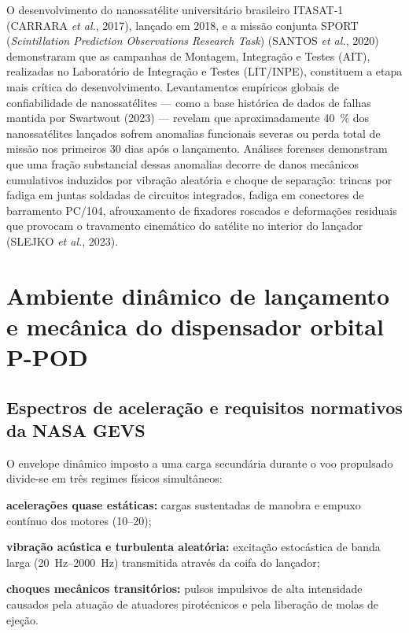 O desenvolvimento do nanossatélite universitário brasileiro ITASAT-1 (CARRARA \textit{et al.}, 2017), lançado em 2018, e a missão conjunta SPORT (\textit{Scintillation Prediction Observations Research Task}) (SANTOS \textit{et al.}, 2020) demonstraram que as campanhas de Montagem, Integração e Testes (AIT), realizadas no Laboratório de Integração e Testes (LIT/INPE), constituem a etapa mais crítica do desenvolvimento. Levantamentos empíricos globais de confiabilidade de nanossatélites — como a base histórica de dados de falhas mantida por Swartwout (2023) — revelam que aproximadamente \SI{40}{\percent} dos nanossatélites lançados sofrem anomalias funcionais severas ou perda total de missão nos primeiros 30 dias após o lançamento. Análises forenses demonstram que uma fração substancial dessas anomalias decorre de danos mecânicos cumulativos induzidos por vibração aleatória e choque de separação: trincas por fadiga em juntas soldadas de circuitos integrados, fadiga em conectores de barramento PC/104, afrouxamento de fixadores roscados e deformações residuais que provocam o travamento cinemático do satélite no interior do lançador (SLEJKO \textit{et al.}, 2023).

\section{Ambiente dinâmico de lançamento e mecânica do dispensador orbital P-POD}
\label{sec:dinamica-ejecao}

\subsection{Espectros de aceleração e requisitos normativos da NASA GEVS}
\label{subsec:gevs-norma}

O envelope dinâmico imposto a uma carga secundária durante o voo propulsado divide-se em três regimes físicos simultâneos:
\begin{alineas}
  \item \textbf{acelerações quase estáticas:} cargas sustentadas de manobra e empuxo contínuo dos motores (\SIrange{10}{20}{\gacc});
  \item \textbf{vibração acústica e turbulenta aleatória:} excitação estocástica de banda larga (\SIrange{20}{2000}{\hertz}) transmitida através da coifa do lançador;
  \item \textbf{choques mecânicos transitórios:} pulsos impulsivos de alta intensidade causados pela atuação de atuadores pirotécnicos e pela liberação de molas de ejeção.
\end{alineas}

